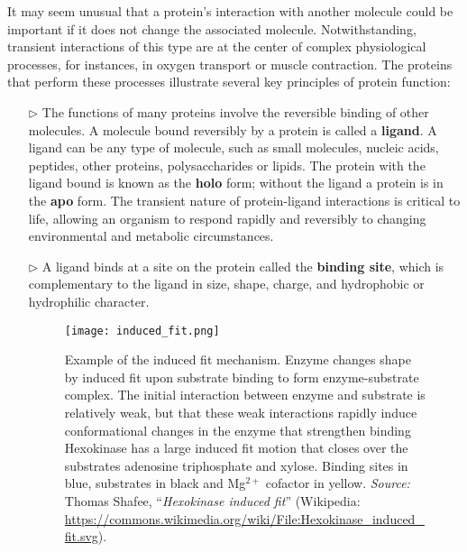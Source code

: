 It may seem unusual that a protein's interaction with another molecule could be important if it does not change the associated molecule. Notwithstanding, transient interactions of this type are at the center of complex physiological processes, for instances, in oxygen transport or muscle contraction. The proteins that perform these processes illustrate several key principles of protein function:%
\begin{itemize}
\item[$\triangleright$] The functions of many proteins involve the reversible binding of other molecules. A molecule bound reversibly by a protein is called a \textbf{ligand}. A ligand can be any type of molecule, such as small molecules, nucleic acids, peptides, other proteins, polysaccharides or lipids. The protein with the ligand bound is known as the \textbf{holo} form; without the ligand a protein is in the \textbf{apo} form. The transient nature of protein-ligand interactions is critical to life, allowing an organism to respond rapidly and reversibly to changing environmental and metabolic circumstances. 

\item[$\triangleright$] A ligand binds at a site on the protein called the \textbf{binding site}, which is complementary to the ligand in size, shape, charge, and hydrophobic or hydrophilic character. 
\begin{figure}[h]
\centering
\begin{minipage}[t]{0.875\textwidth}
\centering
\texttt{[image: induced\_fit.png]}

\caption{\small{Example of the induced fit mechanism.  Enzyme changes shape by induced fit upon substrate binding to form enzyme-substrate complex. The initial interaction between enzyme and substrate is relatively weak, but that these weak interactions rapidly induce conformational changes in the enzyme that strengthen binding Hexokinase has a large induced fit motion that closes over the substrates adenosine triphosphate and xylose. Binding sites in blue, substrates in black and Mg$^{2+}$ cofactor in yellow.
	\textit{Source:} Thomas Shafee, ``\textit{Hexokinase induced fit}'' (Wikipedia: \url{https://commons.wikimedia.org/wiki/File:Hexokinase_induced_fit.svg}).}
}
 
\label{fig:induced-fit}
\end{minipage} 
\end{figure}


\end{itemize}
